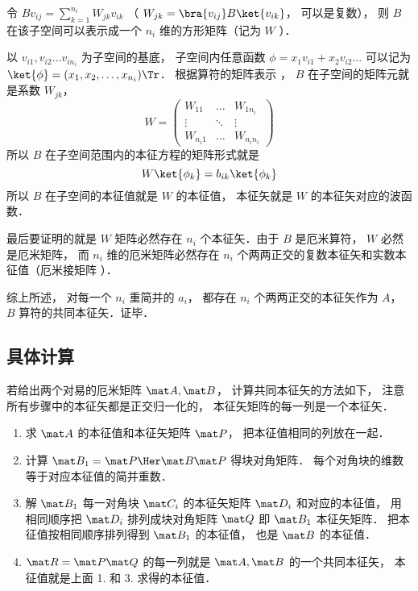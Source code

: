 令 $B v_{ij} = \sum_{k=1}^{n_i} W_{jk}v_{ik}$ （ $W_{jk} = \bra{v_{ij}} B \ket{v_{ik}}$， 可以是复数）， 则 $B$ 在该子空间可以表示成一个 $n_i$ 维的方形矩阵（记为 $W$ ）．

以 $v_{i1}, v_{i2} \dots v_{i n_i}$ 为子空间的基底， 子空间内任意函数 $\phi  = x_1 v_{i1} + x_2 v_{i2}\dots$ 可以记为 $\ket{\phi} = (x_1, x_2, \dots, x_{n_i})\Tr$． 根据算符的矩阵表示
， $B$ 在子空间的矩阵元就是系数 $W_{jk}$， 
\begin{equation}
W = \begin{pmatrix}
W_{11} & \ldots & W_{1 n_i}\\
\vdots & \ddots & \vdots \\
W_{n_i 1} & \ldots & W_{n_i n_i}
\end{pmatrix}
\end{equation}
所以 $B$ 在子空间范围内的本征方程的矩阵形式就是
\begin{equation}
W \ket{\phi_k} = b_{ik} \ket{\phi_k}
\end{equation}
所以 $B$ 在子空间的本征值就是 $W$ 的本征值， 本征矢就是 $W$ 的本征矢对应的波函数．

最后要证明的就是 $W$ 矩阵必然存在 $n_i$ 个本征矢．由于 $B$ 是厄米算符，  $W$ 必然是厄米矩阵， 而 $n_i$ 维的厄米矩阵必然存在 $n_i$ 个两两正交的复数本征矢和实数本征值（厄米接矩阵%
）．

综上所述， 对每一个 $n_i$ 重简并的 $a_i$，  都存在 $n_i$ 个两两正交的本征矢作为 $A$，  $B$ 算符的共同本征矢．证毕．

\subsection{具体计算}
若给出两个对易的厄米矩阵 $\mat A, \mat B$， 计算共同本征矢的方法如下， 注意所有步骤中的本征矢都是正交归一化的， 本征矢矩阵的每一列是一个本征矢．
\begin{enumerate}
\item 求 $\mat A$ 的本征值和本征矢矩阵 $\mat P$， 把本征值相同的列放在一起．
\item 计算 $\mat B_1 = \mat P\Her \mat B\mat P$ 得块对角矩阵． 每个对角块的维数等于对应本征值的简并重数．
\item 解 $\mat B_1$ 每一对角块 $\mat C_i$ 的本征矢矩阵 $\mat D_i$ 和对应的本征值， 用相同顺序把 $\mat D_i$ 排列成块对角矩阵 $\mat Q$ 即 $\mat B_1$ 本征矢矩阵． 把本征值按相同顺序排列得到 $\mat B_1$ 的本征值， 也是 $\mat B$ 的本征值．
\item $\mat R = \mat P\mat Q$ 的每一列就是 $\mat A, \mat B$ 的一个共同本征矢， 本征值就是上面 1. 和 3. 求得的本征值．
\end{enumerate}

